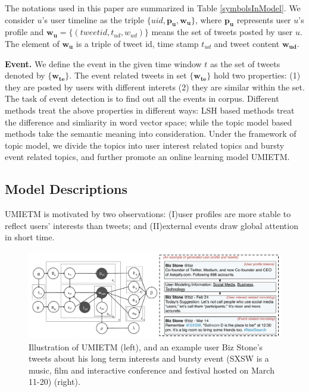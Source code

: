 \documentclass[runningheads,a4paper]{llncs}
\begin{document}
The notations used in this paper are summarized in Table \ref{symbolsInModel}.
We consider \(u\)'s user timeline as  the triple \(\{uid, \bm{p_u},\bm{w_u}\} \), where \(\bm{p_u}\) represents user \(u\)'s profile and \(\bm{w_u}=\{(tweetid, t_{ud},w_{ud})\}\) means the set of tweets posted by user \(u\).
The element of \(\bm{w_u}\) is a triple of tweet id, time stamp \(t_{ud}\) and tweet content \(\bm{w_{ud}}\).



\textbf{Event.} We define the event in the given time window \(t\) as the set of tweets denoted by \( \{ \bm{w_{te}}\}\).
The event related tweets in set \( \{ \bm{w_{te}}\}\)  hold two properties: (1) they are posted by users with different interets (2) they are similar within the set.
The task of event detection is to find out all the events in corpus.
Different methods treat the above properties in different ways: LSH based methods\cite{petrovic2010streaming} treat the difference and simliarity in word vector space; while the topic model based methods\cite{timeUserLDA2012finding} take the semantic meaning into consideration.
Under the framework of topic model, we divide the topics into user interest related topics and bursty event related topics, and further promote an online learning model UMIETM.

\subsection{Model Descriptions}
\label{subsec:model}
UMIETM is motivated by two observations: (I)user profiles are more stable to reflect users' interests than tweets; and (II)external events draw global attention in short time.
\begin{figure}
    \includegraphics[width=1.0\textwidth]{img/model.pdf}
    \caption{Illustration of UMIETM (left), and an example user Biz Stone's tweets about his long term interests and  bursty event (SXSW is a music, film and interactive conference and festival hosted on March 11-20) (right).} 
    \label{fig:modelUMIETM}
\end{figure}
\end{document}
